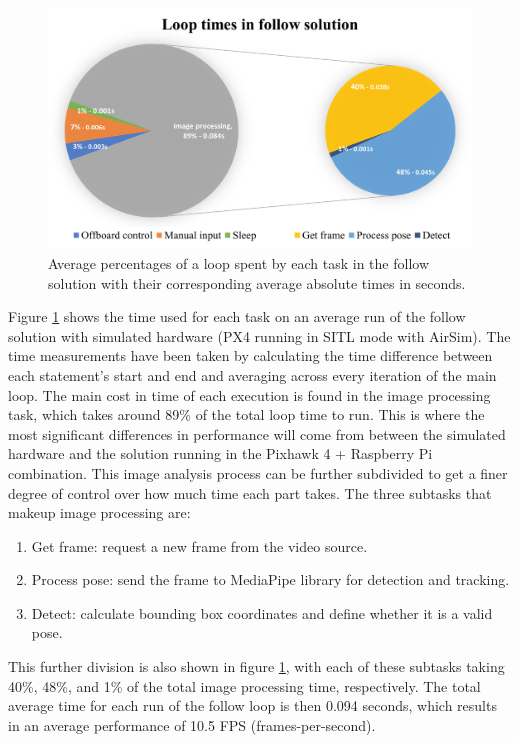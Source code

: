 \begin{figure}
  \centering
  \includegraphics[width=.9\textwidth, keepaspectratio]{img/sitl-performance.png}
  \caption{Average percentages of a loop spent by each task in the follow solution with their corresponding average absolute times in seconds.}
  \label{fig:perf-sitl-sim}
\end{figure}

Figure \ref{fig:perf-sitl-sim} shows the time used for each task on an average run of the follow solution with simulated hardware (PX4 running in SITL mode with AirSim).
The time measurements have been taken by calculating the time difference between each statement's start and end and averaging across every iteration of the main loop.
The main cost in time of each execution is found in the image processing task, which takes around 89\% of the total loop time to run.
This is where the most significant differences in performance will come from between the simulated hardware and the solution running in the Pixhawk 4 + Raspberry Pi combination.
This image analysis process can be further subdivided to get a finer degree of control over how much time each part takes.
The three subtasks that makeup image processing are:
\begin{enumerate}
    \item Get frame: request a new frame from the video source.
    \item Process pose: send the frame to MediaPipe library for detection and tracking.
    \item Detect: calculate bounding box coordinates and define whether it is a valid pose.
\end{enumerate}

This further division is also shown in figure \ref{fig:perf-sitl-sim}, with each of these subtasks taking 40\%, 48\%, and 1\% of the total image processing time, respectively.
The total average time for each run of the follow loop is then 0.094 seconds, which results in an average performance of 10.5 FPS (frames-per-second).

